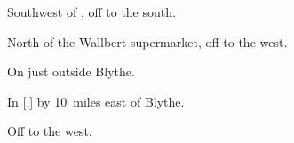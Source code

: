 
\begin{LocationList}

Southwest of , off  to the south.

North of the Wallbert supermarket, off  to the west.

On  just outside Blythe.

\Location{\TruckStop \Gas \Rest \Service \Weigh}
In [,] by  10~miles east of Blythe.

Off  to the west.

\end{LocationList}
